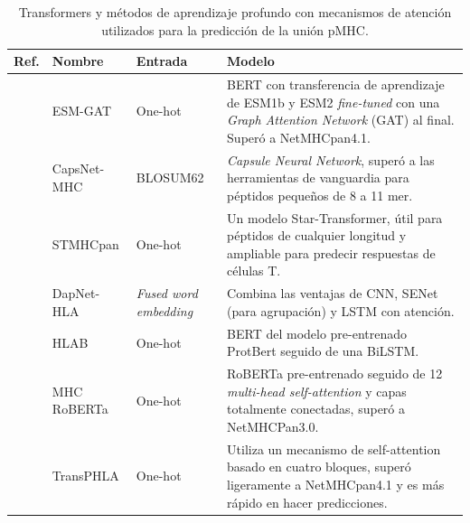 \begin{table}[ht]
	\caption{Transformers y métodos de aprendizaje profundo con mecanismos de atención utilizados para la predicción de la unión pMHC.}
	\label{tab:transformes}
	\setlength{\tabcolsep}{0.5em} %
	{\renewcommand{\arraystretch}{1.1}%
		
		\begin{scriptsize}
			
		
		\begin{tabular}{p{2.5cm}p{2.5cm}p{2cm}p{5.5cm}}
			\multicolumn{1}{l}{\textbf{Ref.}}                                   & \textbf{Nombre}             & \textbf{Entrada}            & \textbf{Modelo}     \\  \hline
			
			\cite{hashemi2023improved}&	ESM-GAT  &	One-hot & BERT con transferencia de aprendizaje de ESM1b y ESM2 \textit{fine-tuned} con una \textit{Graph Attention Network} (GAT) al final. Superó a NetMHCpan4.1.	\\
			
			
			\cite{kalemati2023capsnet}&	CapsNet-MHC&	BLOSUM62 & \textit{Capsule Neural Network}, superó a las herramientas de vanguardia para péptidos pequeños de 8 a 11 mer.	\\
			
			\cite{ye2023stmhcpan}&	STMHCpan  &	One-hot & Un modelo Star-Transformer, útil para péptidos de cualquier longitud y ampliable para predecir respuestas de células T.	\\
			
			\cite{jing2023dapnet}&	DapNet-HLA&	\textit{Fused word embedding} & Combina las ventajas de CNN, SENet (para agrupación) y LSTM con atención.	\\
			
			\cite{zhang2022hlab}&	HLAB&	One-hot & BERT del modelo pre-entrenado ProtBert seguido de una BiLSTM.	\\
			
			\cite{wang2022mhcroberta}          & MHC RoBERTa            & One-hot & RoBERTa pre-entrenado seguido de 12 \textit{multi-head self-attention} y capas totalmente conectadas, superó a NetMHCPan3.0.                                                                                          \\
			\cite{chu2022transformer}          & TransPHLA             & One-hot         & Utiliza un mecanismo de self-attention basado en cuatro bloques, superó ligeramente a NetMHCpan4.1 y es más rápido en hacer predicciones.\\
			

\end{tabular}
\end{scriptsize}}
\end{table}
